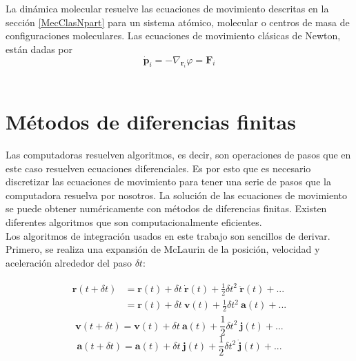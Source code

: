 La dinámica molecular resuelve las ecuaciones de movimiento descritas en la sección \ref{MecClasNpart} para un sistema atómico, molecular o centros de masa de configuraciones moleculares. Las ecuaciones de movimiento clásicas de Newton, están dadas por\\

\begin{equation}
    \mathbf{\dot p}_i = -\nabla_{\mathbf{r}_i} \varphi = \mathbf{F}_i
\end{equation}\\

\section{Métodos de diferencias finitas}

Las computadoras resuelven algoritmos, es decir, son operaciones de pasos que en este caso resuelven ecuaciones diferenciales. Es por esto que es necesario discretizar las ecuaciones de movimiento para tener una serie de pasos que la computadora resuelva por nosotros. La solución de las ecuaciones de movimiento se puede obtener numéricamente con métodos de diferencias finitas. Existen diferentes algoritmos que son computacionalmente eficientes.\cite{Allen2017}\\

Los algoritmos de integración usados en este trabajo son sencillos de derivar. Primero, se realiza una expansión de McLaurin de la posición, velocidad y aceleración alrededor del paso $\delta t$:

\begin{align} \label{taylorexpr}
\begin{split}
    \mathbf{r}(t + \delta t) &= \mathbf{r}(t)+\delta t\ \dot{\mathbf{r}}(t) + \frac{1}{2}\delta t^2\  \ddot{\mathbf{r}}(t)+...\\
                             &= \mathbf{r}(t)+\delta t\ \mathbf{v}(t) + \frac{1}{2}\delta t^2\ \mathbf{a}(t)+...
\end{split}
\end{align}
\begin{equation}\label{taylorexpv}
    \mathbf{v}(t + \delta t) = \mathbf{v}(t)+\delta t\ \mathbf{a}(t) + \frac{1}{2}\delta t^2\ \mathbf{j}(t)+...
\end{equation}
\begin{equation}\label{taylorexpa}
    \mathbf{a}(t + \delta t) = \mathbf{a}(t)+\delta t\ \mathbf{j}(t) + \frac{1}{2}\delta t^2\ \dot{\mathbf{j}}(t)+...
\end{equation}\\


